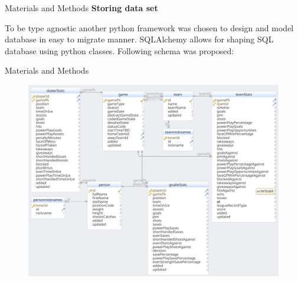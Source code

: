 \begin{frame}{Materials and Methods}
    \textbf{Storing data set}
    \vspace{2em}
   
    To be type agnostic another python framework was chosen to design and model database in easy to migrate manner. SQLAlchemy allows for shaping SQL database using python classes. Following schema was proposed:
\end{frame}

\begin{frame}{Materials and Methods}
    \begin{figure}[H]
        \includegraphics[height=0.9\textheight]{dbschema}
    \end{figure}
\end{frame}

